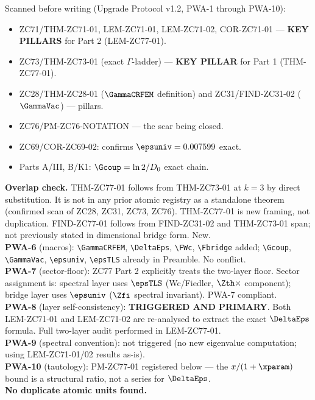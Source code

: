 \documentclass[12pt, a4paper]{article}
\begin{document}
\begin{formalbox}[title={Pre-Work Audit Record --- ZC77}]
Scanned before writing (Upgrade Protocol v1.2, PWA-1 through PWA-10):
\begin{itemize}[leftmargin=2em, noitemsep]
  \item ZC71/THM-ZC71-01, LEM-ZC71-01, LEM-ZC71-02, COR-ZC71-01 ---
    \textbf{KEY PILLARS} for Part 2 (LEM-ZC77-01).
  \item ZC73/THM-ZC73-01 (exact $\Gamma$-ladder) --- \textbf{KEY PILLAR}
    for Part 1 (THM-ZC77-01).
  \item ZC28/THM-ZC28-01 ($\GammaCRFEM$ definition) and
    ZC31/FIND-ZC31-02 ($\GammaVac$) --- pillars.
  \item ZC76/PM-ZC76-NOTATION --- the scar being closed.
  \item ZC69/COR-ZC69-02: confirms $\epsuniv = 0.007599$ exact.
  \item Parts A/III, B/K1: $\Gcoup = \ln2/D_0$ exact chain.
\end{itemize}

\textbf{Overlap check.}
THM-ZC77-01 follows from THM-ZC73-01 at $k=3$ by direct substitution.
It is not in any prior atomic registry as a standalone theorem (confirmed
scan of ZC28, ZC31, ZC73, ZC76). THM-ZC77-01 is new framing, not
duplication.
FIND-ZC77-01 follows from FIND-ZC31-02 and THM-ZC73-01 span; not
previously stated in dimensional bridge form. New.\\
\textbf{PWA-6} (macros): \texttt{\textbackslash GammaCRFEM},
\texttt{\textbackslash DeltaEps}, \texttt{\textbackslash FWc},
\texttt{\textbackslash Fbridge} added;
\texttt{\textbackslash Gcoup}, \texttt{\textbackslash GammaVac},
\texttt{\textbackslash epsuniv}, \texttt{\textbackslash epsTLS}
already in Preamble. No conflict.\\
\textbf{PWA-7} (sector-floor): ZC77 Part 2 explicitly treats the
two-layer floor. Sector assignment is: spectral layer uses $\epsTLS$
(Wc/Fiedler, $\Zth\times$ component); bridge layer uses $\epsuniv$
($\Zfi$ spectral invariant). PWA-7 compliant.\\
\textbf{PWA-8} (layer self-consistency): \textbf{TRIGGERED AND PRIMARY}.
Both LEM-ZC71-01 and LEM-ZC71-02 are re-analysed to extract the exact
$\DeltaEps$ formula. Full two-layer audit performed in LEM-ZC77-01.\\
\textbf{PWA-9} (spectral convention): not triggered (no new eigenvalue
computation; using LEM-ZC71-01/02 results as-is).\\
\textbf{PWA-10} (tautology): PM-ZC77-01 registered below --- the
$x/(1+\xparam)$ bound is a structural ratio, not a series for $\DeltaEps$.\\
\textbf{No duplicate atomic units found.}
\end{formalbox}
\end{document}
